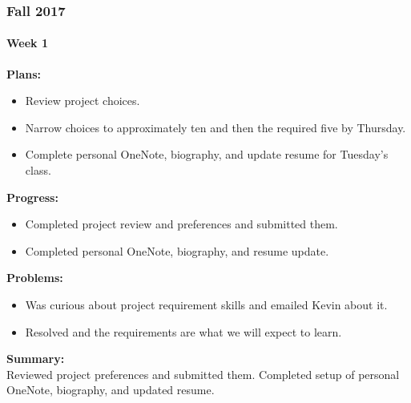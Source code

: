 \subsubsection{Fall 2017}
\paragraph{Week 1}
\begin{adjustwidth}{2.5em}{0pt}
    \vspace{-0.5cm}\textbf{Plans:}
    \vspace{-0.5cm}
    \begin{itemize}
        \item Review project choices. 
        \item Narrow choices to approximately ten and then the required five by Thursday. 
        \item Complete personal OneNote, biography, and update resume for Tuesday's class. 
    \end{itemize} 
    \vspace{-0.3cm}\textbf{Progress:}
    \vspace{-0.5cm}
    \begin{itemize}
        \item Completed project review and preferences and submitted them. 
        \item Completed personal OneNote, biography, and resume update. 
    \end{itemize} 
    \vspace{-0.3cm}\textbf{Problems:}
    \vspace{-0.5cm}
    \begin{itemize}
        \item Was curious about project requirement skills and emailed Kevin about it. 
        \item Resolved and the requirements are what we will expect to learn.
    \end{itemize}  
    \vspace{-0.3cm}\noindent\textbf{Summary:}\\
    \noindent Reviewed project preferences and submitted them. Completed setup of personal OneNote, biography, and updated resume. \\
\end{adjustwidth}

